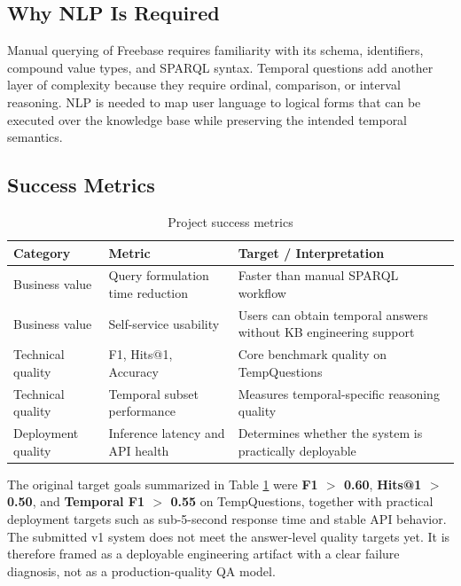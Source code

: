 \documentclass[a4paper,11pt]{article}
\begin{document}
\subsection{Why NLP Is Required}

Manual querying of Freebase requires familiarity with its schema, identifiers, compound value types, and SPARQL syntax. Temporal questions add another layer of complexity because they require ordinal, comparison, or interval reasoning. NLP is needed to map user language to logical forms that can be executed over the knowledge base while preserving the intended temporal semantics.

\subsection{Success Metrics}

\begin{table}[H]
\centering
\caption{Project success metrics}
\label{tab:success-metrics}
\begin{tabular}{p{4cm}p{5cm}p{5cm}}
\toprule
\textbf{Category} & \textbf{Metric} & \textbf{Target / Interpretation} \\
\midrule
Business value & Query formulation time reduction & Faster than manual SPARQL workflow \\
Business value & Self-service usability & Users can obtain temporal answers without KB engineering support \\
Technical quality & F1, Hits@1, Accuracy & Core benchmark quality on TempQuestions \\
Technical quality & Temporal subset performance & Measures temporal-specific reasoning quality \\
Deployment quality & Inference latency and API health & Determines whether the system is practically deployable \\
\bottomrule
\end{tabular}
\end{table}

\noindent The original target goals summarized in Table \ref{tab:success-metrics} were \textbf{F1 $>$ 0.60}, \textbf{Hits@1 $>$ 0.50}, and \textbf{Temporal F1 $>$ 0.55} on TempQuestions, together with practical deployment targets such as sub-5-second response time and stable API behavior. The submitted v1 system does not meet the answer-level quality targets yet. It is therefore framed as a deployable engineering artifact with a clear failure diagnosis, not as a production-quality QA model.
\end{document}
